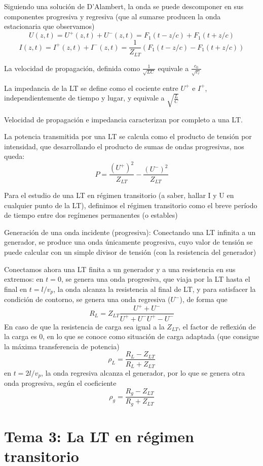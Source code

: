 \documentclass[12pt]{article}
\begin{document}
Siguiendo una soluci\'on de D'Alambert, la onda se puede descomponer en sus componentes progresiva y regresiva (que al sumarse producen la onda estacionaria que observamos)
$$U(z,t) = U^+ (z,t) + U^- (z,t) = F_1(t - z/c) + F_1(t + z/c)$$
$$I(z,t) = I^+ (z,t) + I^- (z,t) =\frac{1}{Z_{LT}}( F_1(t - z/c) - F_1(t + z/c) )$$

La velocidad de propagaci\'on, definida  como $\frac{1}{\sqrt{LC}}$ equivale a $\frac{c_0}{\sqrt{\varepsilon_r}}$

La impedancia de la LT se define como el cociente entre $U^+$ e $I^+$, independientemente de tiempo y lugar, y equivale a $\sqrt{\frac{L}{C}}$

Velocidad de propagaci\'on e impedancia caracterizan por completo a una LT.

La potencia transmitida por una LT se calcula como el producto de tensi\'on por intensidad, que desarrollando el producto de sumas de ondas progresivas, nos queda: 
$$P = \frac{(U^+)^2}{Z_{LT}} -\frac{(U^-)^2}{Z_{LT}}$$

Para el estudio de una LT en r\'egimen transitorio (a saber, hallar I y U en cualquier punto de la LT), definimos el r\'egimen transitorio como el breve per\'iodo de tiempo entre dos reg\'imenes permanentes (o estables)

Generaci\'on de una onda incidente (progresiva):
Conectando una LT infinita a un generador, se produce una onda \'unicamente progresiva, cuyo valor de tensión se puede calcular con un simple divisor de tensión (con la resistencia del generador)

Conectamos ahora una LT finita a un generador y a una resistencia en sus extremos:
	en $t=0$, se genera una onda progresiva, que viaja por la LT hasta el final
	en $t=l/v_p$, la onda alcanza la resistencia al final de LT, y para satisfacer la condici\'on de contorno, se genera una onda regresiva ($U^-$), de forma que 
	$$R_L = Z_{LT}\frac{U^+ +U^-}{U^+ +U^-U^+ -U^-}$$
En caso de que la resistencia de carga sea igual a la $Z_{LT}$, el factor de reflexi\'on de la carga es 0, en lo que se conoce como situaci\'on de carga adaptada (que consigue la m\'axima transferencia de potencia) 
$$\rho_L =\frac{R_L - Z_{LT}}{R_L + Z_{LT}}$$
	en $t=2l/v_p$, la onda regresiva alcanza el generador, por lo que se genera otra onda progresiva, según el coeficiente
	$$\rho_g =\frac{R_g - Z_{LT}}{R_g + Z_{LT}}$$

\section{Tema 3: La LT en r\'egimen transitorio}
\end{document}
